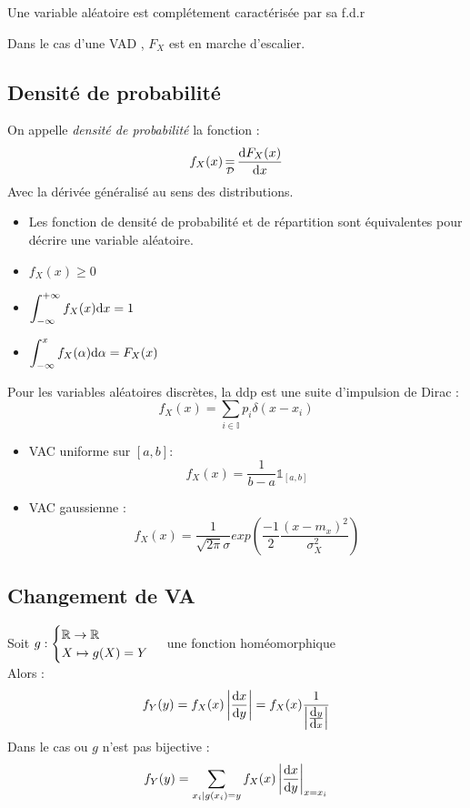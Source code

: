 \documentclass[main.tex]{subfiles}
\begin{document}
Une variable aléatoire est complétement caractérisée par sa f.d.r
\begin{rem}
  Dans le cas d'une VAD , $F_X$ est en marche d'escalier.
\end{rem}
\subsection{Densité de probabilité}
\begin{defin}
  On appelle \emph{densité de probabilité} la fonction :
  \[
f_X(x) \equals_{\mathcal{D}} \deriv[F_X(x)]{x}
\]
Avec la dérivée généralisé au sens des distributions.
\end{defin}
\begin{prop}
  \begin{itemize}
  \item Les fonction de densité de probabilité et de répartition sont équivalentes pour décrire une variable aléatoire.
  \item $f_X(x)\ge 0$
  \item $\displaystyle \int_{-\infty}^{+\infty}f_X(x)\d x = 1$
  \item $\displaystyle \int_{-\infty}^{x}f_X(\alpha)\d \alpha = F_X(x)$
  \end{itemize}
\end{prop}

\begin{rem}
  Pour les variables aléatoires discrètes, la ddp est une suite d'impulsion de Dirac :
  \[
    f_X(x) = \sum_{i\in\mathbb{I}}p_i\delta(x-x_i)
  \]
\end{rem}

\begin{exemple}
  \begin{itemize}
  \item VAC uniforme sur $[a,b]$:
    \[
      f_X(x) = \frac{1}{b-a} \mathbb{1}_{[a,b]}
    \]
  \item VAC gaussienne :
    \[
      f_X(x) = \frac{1}{\sqrt{2\pi}\sigma} exp\left(\frac{-1}{2}\frac{(x-m_x)^2}{\sigma_X^2}\right)
    \]
  \end{itemize}
\end{exemple}

\subsection{Changement de VA}
\begin{prop}
  Soit $g :
  \begin{cases}
    \R \to \R \\
    X \mapsto g(X) = Y
  \end{cases}$ une fonction homéomorphique\footnotemark \\
  Alors :
  \[
    f_Y(y) = f_X(x) \left|\deriv[x]{y}\right| = f_X(x) \frac{1}{ \left|\deriv[y]{x}\right|}
  \]
  Dans le cas ou $g$ n'est pas bijective :
  \[
    f_Y(y) = \sum_{x_i|g(x_i)=y}^{}f_X(x) \left|\deriv[x]{y}\right|_{x=x_i}
  \]
\end{prop}
\end{document}
